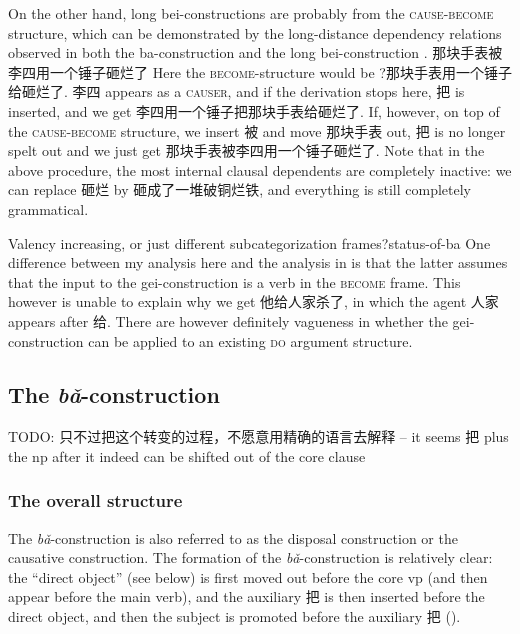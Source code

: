 \documentclass[UTF8, a4paper, oneside, scheme=plain, 12pt]{ctexrep}
\newcommand*{\citesec}[1]{\S~{#1}}
\newcommand*{\citepage}[1]{p.~{#1}}
\newcommand{\form}[1]{\emph{#1}}
\newcommand*{\category}[1]{\textsc{#1}}
\begin{document}
On the other hand, long bei-constructions are probably 
from the \category{cause}-\category{become} structure,
which can be demonstrated by the long-distance dependency relations 
observed in both the ba-construction  
and the long bei-construction
\citep[\citesec{4.2.1.5}]{huang2013}.
那块手表被李四用一个锤子砸烂了 
Here the \category{become}-structure would be 
?那块手表用一个锤子给砸烂了. 
李四 appears as a \category{causer},
and if the derivation stops here, 
把 is inserted, and we get 李四用一个锤子把那块手表给砸烂了.
If, however, on top of the \category{cause}-\category{become} structure, 
we insert 被 and move 那块手表 out, 
把 is no longer spelt out 
and we just get 那块手表被李四用一个锤子砸烂了.
Note that in the above procedure, 
the most internal clausal dependents are completely inactive: 
we can replace 砸烂 by 砸成了一堆破铜烂铁, 
and everything is still completely grammatical.

\begin{infobox}{Valency increasing, or just different subcategorization frames?}{status-of-ba}
    One difference between my analysis here and the analysis in \citet[\citepage{202}]{deng2010formal}
    is that the latter assumes that the input to the gei-construction 
    is a verb in the \category{become} frame.
    This however is unable to explain why we get 他给人家杀了,
    in which the agent 人家 appears after 给.
    There are however definitely vagueness in whether 
    the gei-construction can be applied to an existing \category{do} argument structure.
\end{infobox}


\subsection{The \form{bǎ}-construction}\label{sec:verb-phrase.object.ba}

TODO: 只不过把这个转变的过程，不愿意用精确的语言去解释 -- it seems 把 plus the \acs{np} after it indeed can be shifted out of the core clause

\subsubsection{The overall structure}

The \form{bǎ}-construction is also referred to as 
the disposal construction or the causative construction.
The formation of the \form{bǎ}-construction is relatively clear: 
the ``direct object'' (see below) is first moved out
before the core \acs{vp} 
(and then appear before the main verb),
and the auxiliary 把 is then inserted before the direct object,
and then the subject is promoted before the auxiliary 把 ().
\end{document}
